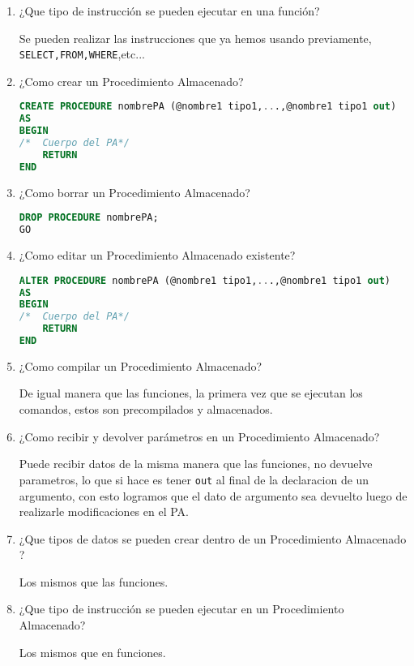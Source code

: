 \begin{enumerate}
\item ¿Que tipo de instrucción se pueden ejecutar en una función?

Se pueden realizar las instrucciones que ya hemos usando previamente, \texttt{SELECT,FROM,WHERE},etc...

\item ¿Como crear un Procedimiento Almacenado?

\begin{lstlisting}[language=SQL]
CREATE PROCEDURE nombrePA (@nombre1 tipo1,...,@nombre1 tipo1 out)
AS
BEGIN
/* 	Cuerpo del PA*/
	RETURN
END
\end{lstlisting}

\item ¿Como borrar un Procedimiento Almacenado?

\begin{lstlisting}[language=SQL]
DROP PROCEDURE nombrePA;  
GO  
\end{lstlisting}

\item ¿Como editar un Procedimiento Almacenado existente?

\begin{lstlisting}[language=SQL]
ALTER PROCEDURE nombrePA (@nombre1 tipo1,...,@nombre1 tipo1 out)
AS
BEGIN
/* 	Cuerpo del PA*/
	RETURN
END
\end{lstlisting}

\item ¿Como compilar un Procedimiento Almacenado?

De igual manera que las funciones, la primera vez que se ejecutan los comandos, estos son precompilados y almacenados.

\item ¿Como recibir y devolver parámetros en un Procedimiento Almacenado?

Puede recibir datos de la misma manera que las funciones, no devuelve parametros, lo que si hace es tener \texttt{out} al final de la declaracion de un argumento, con esto logramos que el dato de argumento sea devuelto luego de realizarle modificaciones en el PA.

\item ¿Que tipos de datos se pueden crear dentro de un Procedimiento Almacenado
?

Los mismos que las funciones.

\item ¿Que tipo de instrucción se pueden ejecutar en un Procedimiento Almacenado?

Los mismos que en funciones.

\end{enumerate}

